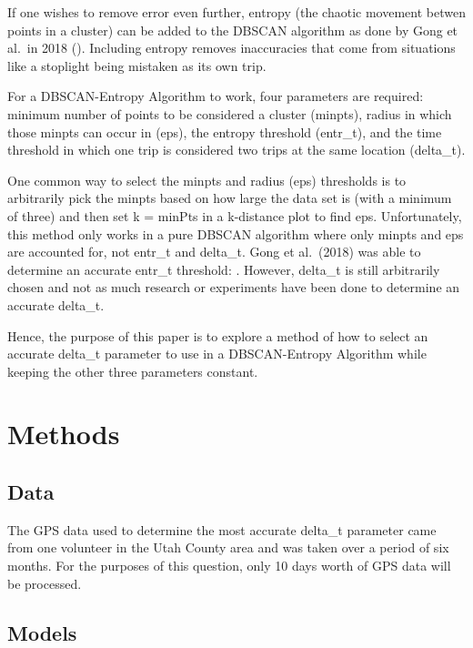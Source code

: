 \documentclass[3p, authoryear]{elsarticle} %
\begin{document}
If one wishes to remove error even further, entropy (the chaotic movement betwen points in a cluster) can be added to the DBSCAN algorithm as done by Gong et al.~in 2018 (\citep{GongInspiration}). Including entropy removes inaccuracies that come from situations like a stoplight being mistaken as its own trip.

For a DBSCAN-Entropy Algorithm to work, four parameters are required: minimum number of points to be considered a cluster (minpts), radius in which those minpts can occur in (eps), the entropy threshold (entr\_t), and the time threshold in which one trip is considered two trips at the same location (delta\_t).

One common way to select the minpts and radius (eps) thresholds is to arbitrarily pick the minpts based on how large the data set is (with a minimum of three) and then set k = minPts in a k-distance plot \citep{RKNNMethod2018} to find eps. Unfortunately, this method only works in a pure DBSCAN algorithm where only minpts and eps are accounted for, not entr\_t and delta\_t. Gong et al.~(2018) was able to determine an accurate entr\_t threshold: . However, delta\_t is still arbitrarily chosen and not as much research or experiments have been done to determine an accurate delta\_t.

Hence, the purpose of this paper is to explore a method of how to select an accurate delta\_t parameter to use in a DBSCAN-Entropy Algorithm while keeping the other three parameters constant.

\hypertarget{methods}{%
\section{Methods}\label{methods}}

\hypertarget{data}{%
\subsection{Data}\label{data}}

The GPS data used to determine the most accurate delta\_t parameter came from one volunteer in
the Utah County area and was taken over a period of six months. For the purposes of this question, only 10 days worth of GPS data will be processed.

\hypertarget{models}{%
\subsection{Models}\label{models}}
\end{document}
